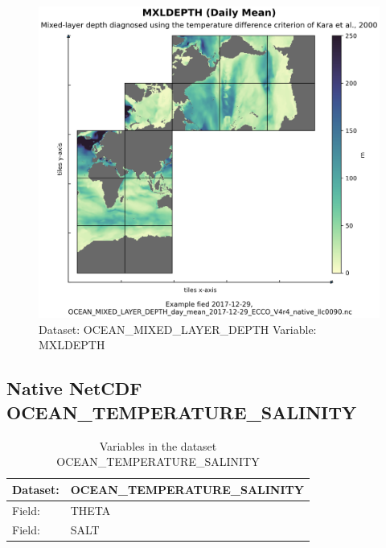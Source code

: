 \begin{figure}[H]
\centering
\includegraphics[scale=0.55]{../images/plots/native_plots/Ocean_Mixed_Layer_Depth/MXLDEPTH.png}
\caption{Dataset: OCEAN\_MIXED\_LAYER\_DEPTH Variable: MXLDEPTH}
\label{tab:table-OCEAN_MIXED_LAYER_DEPTH_MXLDEPTH-Plot}
\end{figure}
\pagebreak
\subsection{Native NetCDF OCEAN\_TEMPERATURE\_SALINITY}
\newp
\begin{longtable}{|p{}|p{}|}
\caption{Variables in the dataset OCEAN\_TEMPERATURE\_SALINITY}
\label{tab:table-OCEAN_TEMPERATURE_SALINITY-fields} \\ 
\hline \endhead \hline \endfoot
\rowcolor{lightgray} \textbf{Dataset:} & \textbf{OCEAN\_TEMPERATURE\_SALINITY} \\ \hline
Field: &THETA \\ \hline
Field: &SALT \\ \hline
\end{longtable}

\pagebreak
